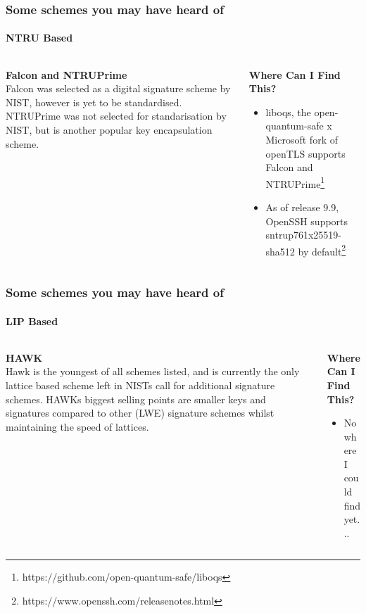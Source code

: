 \documentclass[
aspectratio=169, %
t, %
onlytextwidth, %
10pt, %
]{beamer}
\begin{document}
\begin{frame}
    \frametitle{Some schemes you may have heard of}
    \framesubtitle{NTRU Based}

    \begin{columns}[T] %
        \begin{column}{0.42\linewidth} %
            \textbf{Falcon and NTRUPrime}\\
            
            Falcon was selected as a digital signature scheme by NIST, however is yet to be standardised. NTRUPrime was not selected for standarisation by NIST, but is another popular key encapsulation scheme.
        \end{column}
        \begin{column}{0.55\linewidth} %
            \textbf{Where Can I Find This?}\\
            \begin{itemize}
                \item liboqs, the open-quantum-safe x Microsoft fork of openTLS supports Falcon and NTRUPrime\footnote{https://github.com/open-quantum-safe/liboqs}
                \item As of release 9.9, OpenSSH supports sntrup761x25519-sha512 by default\footnote{https://www.openssh.com/releasenotes.html}
            \end{itemize}
        \end{column}
    \end{columns}
\end{frame}


\begin{frame}
    \frametitle{Some schemes you may have heard of}
    \framesubtitle{LIP Based}

    \begin{columns}[T] %
        \begin{column}{0.58\linewidth} %
            \textbf{HAWK}\\
            
            Hawk is the youngest of all schemes listed, and is currently the only lattice based scheme left in NISTs call for additional signature schemes. HAWKs biggest selling points are smaller keys and signatures compared to other (LWE) signature schemes whilst maintaining the speed of lattices.
        \end{column}
        \begin{column}{0.4\linewidth} %
            \textbf{Where Can I Find This?}\\
            \begin{itemize}
                \item No where I could find yet...
            \end{itemize}
        \end{column}
    \end{columns}
\end{frame}
\end{document}
